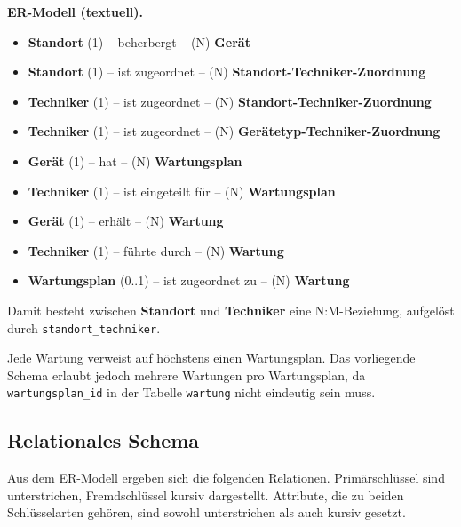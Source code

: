 \documentclass[11pt,a4paper]{article}
\begin{document}
\begin{beispielbox}
\textbf{ER-Modell (textuell).}

\begin{itemize}[leftmargin=1.4em, topsep=2pt]
  \item \textbf{Standort} (1) -- beherbergt -- (N)
        \textbf{Gerät}

  \item \textbf{Standort} (1) -- ist zugeordnet -- (N)
        \textbf{Standort-Techniker-Zuordnung}

  \item \textbf{Techniker} (1) -- ist zugeordnet -- (N)
        \textbf{Standort-Techniker-Zuordnung}

  \item \textbf{Techniker} (1) -- ist zugeordnet -- (N)
        \textbf{Gerätetyp-Techniker-Zuordnung}

  \item \textbf{Gerät} (1) -- hat -- (N)
        \textbf{Wartungsplan}

  \item \textbf{Techniker} (1) -- ist eingeteilt für -- (N)
        \textbf{Wartungsplan}

  \item \textbf{Gerät} (1) -- erhält -- (N)
        \textbf{Wartung}

  \item \textbf{Techniker} (1) -- führte durch -- (N)
        \textbf{Wartung}

  \item \textbf{Wartungsplan} (0..1) -- ist zugeordnet zu -- (N)
        \textbf{Wartung}
\end{itemize}

Damit besteht zwischen \textbf{Standort} und \textbf{Techniker}
eine N:M-Beziehung, aufgelöst durch
\texttt{standort\_techniker}.

Jede Wartung verweist auf höchstens einen Wartungsplan.
Das vorliegende Schema erlaubt jedoch mehrere Wartungen pro
Wartungsplan, da \texttt{wartungsplan\_id} in der Tabelle
\texttt{wartung} nicht eindeutig sein muss.
\end{beispielbox}

\subsection{Relationales Schema}

Aus dem ER-Modell ergeben sich die folgenden Relationen.
Primärschlüssel sind unterstrichen, Fremdschlüssel kursiv dargestellt.
Attribute, die zu beiden Schlüsselarten gehören, sind sowohl
unterstrichen als auch kursiv gesetzt.
\end{document}
